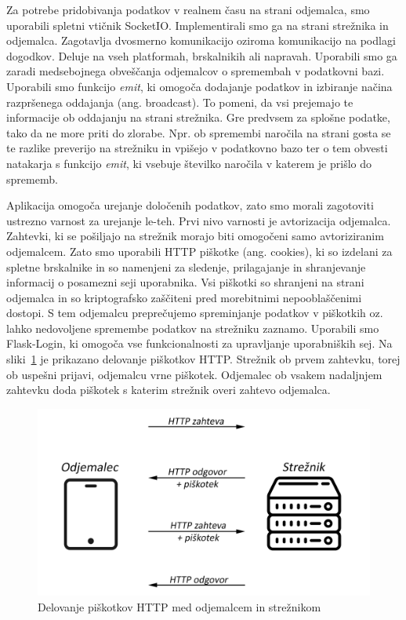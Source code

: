 \documentclass[a4paper, 12pt]{book}
\begin{document}
Za potrebe pridobivanja podatkov v realnem času na strani odjemalca, smo uporabili spletni vtičnik SocketIO. Implementirali smo ga na strani strežnika in odjemalca. Zagotavlja dvosmerno komunikacijo oziroma komunikacijo na podlagi dogodkov. Deluje na vseh platformah, brskalnikih ali napravah. Uporabili smo ga zaradi medsebojnega obveščanja odjemalcov o spremembah v podatkovni bazi. Uporabili smo funkcijo \textit{emit}, ki omogoča dodajanje podatkov in izbiranje načina razpršenega oddajanja (ang. broadcast). To pomeni, da vsi prejemajo te informacije ob oddajanju na strani strežnika. Gre predvsem za splošne podatke, tako da ne more priti do zlorabe. Npr. ob spremembi naročila na strani gosta se te razlike preverijo na strežniku in vpišejo v podatkovno bazo ter o tem obvesti natakarja s funkcijo \textit{emit}, ki vsebuje številko naročila v katerem je prišlo do sprememb. 
	

Aplikacija omogoča urejanje določenih podatkov, zato smo morali zagotoviti ustrezno varnost za urejanje le-teh. Prvi nivo varnosti je avtorizacija odjemalca. Zahtevki, ki se pošiljajo na strežnik morajo biti omogočeni samo avtoriziranim odjemalcem. Zato smo uporabili HTTP piškotke (ang. cookies), ki so izdelani za spletne brskalnike in so namenjeni za sledenje, prilagajanje in shranjevanje informacij o posamezni seji uporabnika. Vsi piškotki so shranjeni na strani odjemalca in so kriptografsko zaščiteni pred morebitnimi nepooblaščenimi dostopi. S tem odjemalcu preprečujemo spreminjanje podatkov v piškotkih oz. lahko nedovoljene spremembe podatkov na strežniku zaznamo. Uporabili smo Flask-Login, ki omogoča vse funkcionalnosti za upravljanje uporabniških sej. 
Na sliki~\ref{Cookies} je prikazano delovanje piškotkov HTTP. Strežnik ob prvem zahtevku, torej ob uspešni prijavi, odjemalcu vrne piškotek. Odjemalec ob vsakem nadaljnjem zahtevku doda piškotek s katerim strežnik overi zahtevo odjemalca.

\begin{figure}[!htb]
\begin{center}
\includegraphics[width=14cm]{cookie-how1.png}
\caption{Delovanje piškotkov HTTP med odjemalcem in strežnikom}
\label{Cookies}
\end{center}
\end{figure}
\end{document}
